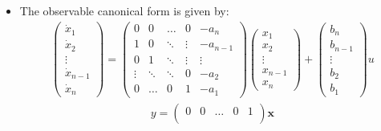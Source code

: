 \documentclass[12pt,a4paper]{article}
\begin{document}
\begin{itemize}
\item The observable canonical form is given by:
\begin{gather*}
\begin{pmatrix}
\dot{x}_{1}\\
\dot{x}_{2}\\
\vdots\\
\dot{x}_{n-1}\\
\dot{x}_{n}
\end{pmatrix} =
\begin{pmatrix}
0 & 0 &  \ldots & 0& -a_{n}\\
1 & 0 &  \ddots &  \vdots &  -a_{n-1}\\
0 &1 &\ddots  & \vdots & \vdots \\
\vdots & \ddots & \ddots & 0 & -a_{2}\\
0 & \ldots & 0 & 1 & -a_{1}
\end{pmatrix} 
\begin{pmatrix}
{x}_{1}\\
{x}_{2}\\
\vdots\\
{x}_{n-1}\\
{x}_{n}
\end{pmatrix}
+
\begin{pmatrix}
b_{n}\\
b_{n-1}\\
\vdots\\
b_{2}\\
b_{1}
\end{pmatrix}u
\end{gather*}
\begin{gather*}
y = \begin{pmatrix}
0&0&\ldots&0&1\\
\end{pmatrix}
\mathbf{x}
\end{gather*}


\end{itemize}
\end{document}
